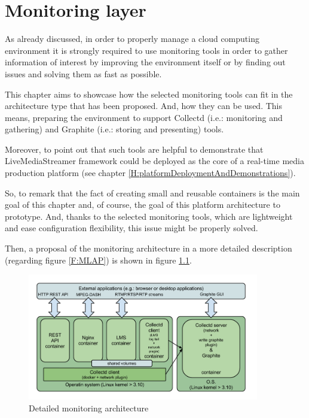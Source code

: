 \chapter{Monitoring layer}\label{G:monitoringLayer}

As already discussed, in order to properly manage a cloud computing environment it is strongly required to use monitoring tools in order to gather information of interest by improving the environment itself or by finding out issues and solving them as fast as possible.

This chapter aims to showcase how the selected monitoring tools can fit in the architecture type that has been proposed. And, how they can be used. This means, preparing the environment to support Collectd (i.e.: monitoring and gathering) and Graphite (i.e.: storing and presenting) tools.

Moreover, to point out that such tools are helpful to demonstrate that LiveMediaStreamer framework could be deployed as the core of a real-time media production platform (see chapter \ref{H:platformDeploymentAndDemonstrations}).

So, to remark that the fact of creating small and reusable containers is the main goal of this chapter and, of course, the goal of this platform architecture to prototype. And, thanks to the selected monitoring tools, which are lightweight and ease configuration flexibility, this issue might be properly solved.

Then, a proposal of the monitoring architecture in a more detailed description (regarding figure \ref{F:MLAP}) is shown in figure \ref{F:maex}.

\begin{figure}[htb]
\begin{center}
\includegraphics[width=0.9\textwidth]{./images/monitArchProp.png}
\caption{Detailed monitoring architecture}
\label{F:maex}
\end{center}
\end{figure}

